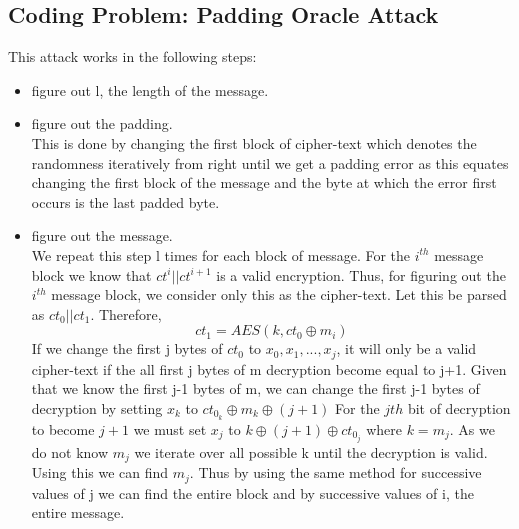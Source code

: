 \documentclass{article}
\begin{document}
\subsection{Coding Problem: Padding Oracle Attack}

This attack works in the following steps:
\begin{itemize}
    \item figure out l, the length of the message.
    \item figure out the padding.\\
    This is done by changing the first block of cipher-text which denotes the randomness iteratively from right until we get a padding error as this equates changing the first block of the message and the byte at which the error first occurs is the last padded byte.
    \item figure out the message.\\
    We repeat this step l times for each block of message. For the $i^{th}$ message block we know that $ct^i||ct^{i+1}$ is a valid encryption. Thus, for figuring out the $i^{th}$ message block, we consider only this as the cipher-text. Let this be parsed as $ct_0||ct_1$. Therefore,
    \[ct_1=AES(k,ct_0 \oplus m_i)\]
    If we change the first j bytes of $ct_0$ to $x_0,x_1,...,x_j$, it will only be a valid cipher-text if the all first j bytes of m decryption become equal to j+1. Given that we know the first j-1 bytes of m, we can change the first j-1 bytes of decryption by setting $x_k$ to $ct_{0_k}\oplus m_k \oplus (j+1)$
    For the $jth$ bit of decryption to become $j+1$ we must set $x_j$ to $k \oplus (j+1) \oplus ct_{0_j}$ where $k=m_j$. As we do not know $m_j$ we iterate over all possible k until the decryption is valid. Using this we can find $m_j$. Thus by using the same method for successive values of j we can find the entire block and by successive values of i, the entire message.\end{itemize}
\end{document}
